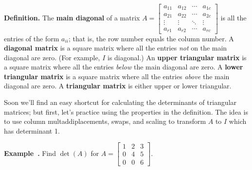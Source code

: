 \documentclass[11pt, letterpaper]{report}
\newenvironment{notes}{}{}
\newcounter{example}[section]
\newcommand{\example}{\refstepcounter{example}%
\par\noindent\textbf{Example~\theexample.} }
\newenvironment{definition}{\begin{bbox}\par\noindent\textbf{Definition. }}
  {\end{bbox}}
\newlength\oldfboxsep%
\newlength\myminiwidth%
\newenvironment{bbox}{%
  \setlength\oldfboxsep\fboxsep
  \setlength{\fboxsep}{.1in}%
  \setlength\myminiwidth\linewidth%
  \addtolength\myminiwidth{-0.2in}%
  \vspace{0.1in}%
  \begin{lrbox}{\bboxbox}\begin{minipage}{\myminiwidth}%
    }{%
    \end{minipage}\end{lrbox}%
  \noindent\fbox{\usebox{\bboxbox}}\vspace{0.1in}\setlength\fboxsep\oldfboxsep%
}
\begin{document}
\begin{definition}    
The \textbf{main diagonal} of a matrix $A = \begin{bmatrix}
a_{11} & a_{12} & \cdots & a_{1c} \\
a_{21} & a_{22} & \cdots & a_{2c} \\
\vdots & \vdots & \ddots & \vdots \\
a_{r1} & a_{r2} & \cdots & a_{rc}
\end{bmatrix}$ is all the entries of the form $a_{ii}$; that is, the row number equals the column number. A \textbf{diagonal matrix} is a square matrix where all the entries \emph{not} on the main diagonal are zero. (For example, $I$ is diagonal.) An \textbf{upper triangular matrix} is a square matrix where all the entries \emph{below} the main diagonal are zero. A \textbf{lower triangular matrix} is a square matrix where all the entries \emph{above} the main diagonal are zero. A \textbf{triangular matrix} is either upper or lower triangular. 
\end{definition}

Soon we'll find an easy shortcut for calculating the determinants of triangular matrices; but first, let's practice using the properties in the definition. The idea is to use column multaddiplacements, swaps, and scaling to transform $A$ to $I$ which has determinant 1.

\begin{notes}
\newpage
\end{notes}

\example \label{example:3.1col-reduction} Find $\det(A)$ for $A =\begin{bmatrix}
1 & 2 & 3 \\
0 & 4 & 5 \\
0 & 0 & 6
\end{bmatrix}$.

\begin{notes}
\vfill
\end{notes}
\end{document}
